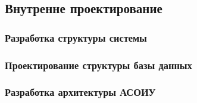 \subsection{Внутренне проектирование}
\subsubsection{Разработка структуры системы}
\subsubsection{Проектирование структуры базы данных}
\subsubsection{Разработка архитектуры АСОИУ}